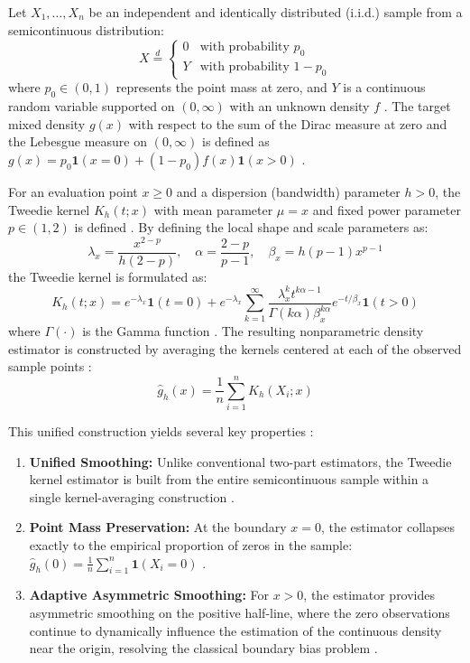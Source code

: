 Let $X_1, \dots, X_n$ be an independent and identically distributed (i.i.d.) sample from a semicontinuous distribution:
\[
X \overset{d}{=} \begin{cases} 0 & \text{with probability } p_0 \\ Y & \text{with probability } 1 - p_0 \end{cases}
\]
where $p_0 \in (0,1)$ represents the point mass at zero, and $Y$ is a continuous random variable supported on $(0,\infty)$ with an unknown density $f$ \cite{tweedie_kde, boundary_correction}. The target mixed density $g(x)$ with respect to the sum of the Dirac measure at zero and the Lebesgue measure on $(0,\infty)$ is defined as $g(x) = p_0 \mathbf{1}(x = 0) + (1-p_0)f(x)\mathbf{1}(x > 0)$ \cite{tweedie_kde}.

For an evaluation point $x \geq 0$ and a dispersion (bandwidth) parameter $h > 0$, the Tweedie kernel $K_h(t; x)$ with mean parameter $\mu = x$ and fixed power parameter $p \in (1,2)$ is defined \cite{tweedie_kde}. By defining the local shape and scale parameters as:
\[
\lambda_x = \frac{x^{2-p}}{h(2-p)}, \quad \alpha = \frac{2-p}{p-1}, \quad \beta_x = h(p-1)x^{p-1}
\]
the Tweedie kernel is formulated as:
\[
K_h(t; x) = e^{-\lambda_x} \mathbf{1}(t = 0) + e^{-\lambda_x} \sum_{k=1}^{\infty} \frac{\lambda_x^k t^{k\alpha - 1}}{\Gamma(k\alpha) \beta_x^{k\alpha}} e^{-t/\beta_x} \mathbf{1}(t > 0)
\]
where $\Gamma(\cdot)$ is the Gamma function \cite{tweedie_kde}. The resulting nonparametric density estimator is constructed by averaging the kernels centered at each of the observed sample points \cite{tweedie_kde}:
\[
\hat{g}_h(x) = \frac{1}{n} \sum_{i=1}^n K_h(X_i; x)
\]

This unified construction yields several key properties \cite{tweedie_kde, boundary_correction}:
\begin{enumerate}
    \item \textbf{Unified Smoothing:} Unlike conventional two-part estimators, the Tweedie kernel estimator is built from the entire semicontinuous sample within a single kernel-averaging construction \cite{tweedie_kde, boundary_correction}.
    \item \textbf{Point Mass Preservation:} At the boundary $x = 0$, the estimator collapses exactly to the empirical proportion of zeros in the sample: $\hat{g}_h(0) = \frac{1}{n} \sum_{i=1}^n \mathbf{1}(X_i = 0)$ \cite{tweedie_kde}.
    \item \textbf{Adaptive Asymmetric Smoothing:} For $x > 0$, the estimator provides asymmetric smoothing on the positive half-line, where the zero observations continue to dynamically influence the estimation of the continuous density near the origin, resolving the classical boundary bias problem \cite{tweedie_kde}.
\end{enumerate}

